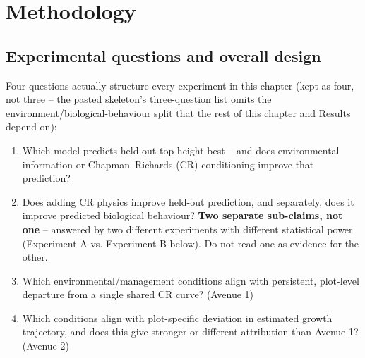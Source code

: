 
\chapter{Methodology}

\section{Experimental questions and overall design}

Four questions actually structure every experiment in this chapter (kept as four, not three --
the pasted skeleton's three-question list omits the environment/biological-behaviour split that
the rest of this chapter and Results depend on):

\begin{enumerate}
  \setlength{\itemsep}{0pt}
  \item Which model predicts held-out top height best -- and does environmental information or
  Chapman--Richards (CR) conditioning improve that prediction?
  \item Does adding CR physics improve held-out prediction, and separately, does it improve
  predicted biological behaviour? \textbf{Two separate sub-claims, not one} -- answered by two
  different experiments with different statistical power (Experiment A vs. Experiment B below).
  Do not read one as evidence for the other.
  \item Which environmental/management conditions align with persistent, plot-level departure
  from a single shared CR curve? (Avenue 1)
  \item Which conditions align with plot-specific deviation in estimated growth trajectory, and
  does this give stronger or different attribution than Avenue 1? (Avenue 2)
\end{enumerate}

